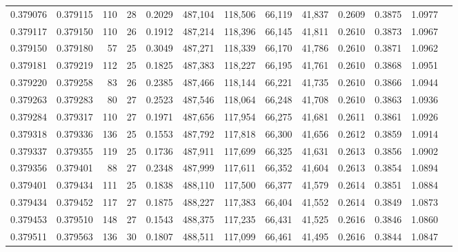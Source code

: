 \begin{tabular}{rrrrrrrrrrrrr}
0.379076 & 0.379115 &   110 &  28 &                                     0.2029 & 487,104 & 118,506 &  66,119 &  41,837 & 0.2609 & 0.3875 & 1.0977 \\
0.379117 & 0.379150 &   110 &  26 &                                     0.1912 & 487,214 & 118,396 &  66,145 &  41,811 & 0.2610 & 0.3873 & 1.0967 \\
0.379150 & 0.379180 &    57 &  25 &                                     0.3049 & 487,271 & 118,339 &  66,170 &  41,786 & 0.2610 & 0.3871 & 1.0962 \\
0.379181 & 0.379219 &   112 &  25 &                                     0.1825 & 487,383 & 118,227 &  66,195 &  41,761 & 0.2610 & 0.3868 & 1.0951 \\
0.379220 & 0.379258 &    83 &  26 &                                     0.2385 & 487,466 & 118,144 &  66,221 &  41,735 & 0.2610 & 0.3866 & 1.0944 \\
0.379263 & 0.379283 &    80 &  27 &                                     0.2523 & 487,546 & 118,064 &  66,248 &  41,708 & 0.2610 & 0.3863 & 1.0936 \\
0.379284 & 0.379317 &   110 &  27 &                                     0.1971 & 487,656 & 117,954 &  66,275 &  41,681 & 0.2611 & 0.3861 & 1.0926 \\
0.379318 & 0.379336 &   136 &  25 &                                     0.1553 & 487,792 & 117,818 &  66,300 &  41,656 & 0.2612 & 0.3859 & 1.0914 \\
0.379337 & 0.379355 &   119 &  25 &                                     0.1736 & 487,911 & 117,699 &  66,325 &  41,631 & 0.2613 & 0.3856 & 1.0902 \\
0.379356 & 0.379401 &    88 &  27 &                                     0.2348 & 487,999 & 117,611 &  66,352 &  41,604 & 0.2613 & 0.3854 & 1.0894 \\
0.379401 & 0.379434 &   111 &  25 &                                     0.1838 & 488,110 & 117,500 &  66,377 &  41,579 & 0.2614 & 0.3851 & 1.0884 \\
0.379434 & 0.379452 &   117 &  27 &                                     0.1875 & 488,227 & 117,383 &  66,404 &  41,552 & 0.2614 & 0.3849 & 1.0873 \\
0.379453 & 0.379510 &   148 &  27 &                                     0.1543 & 488,375 & 117,235 &  66,431 &  41,525 & 0.2616 & 0.3846 & 1.0860 \\
0.379511 & 0.379563 &   136 &  30 &                                     0.1807 & 488,511 & 117,099 &  66,461 &  41,495 & 0.2616 & 0.3844 & 1.0847 \\

\end{tabular}
